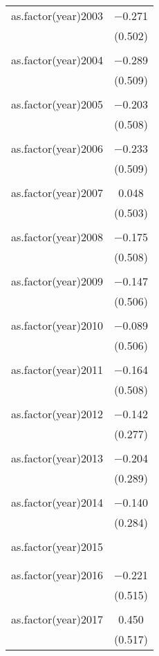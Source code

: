 \documentclass[12pt,letterpaper]{article}
\begin{document}
\begin{table}[!htbp]
\begin{tabular}{@{\extracolsep{5pt}}lc}
		as.factor(year)2003 & $-$0.271 \\ 
		& (0.502) \\ 
		& \\ 
		as.factor(year)2004 & $-$0.289 \\ 
		& (0.509) \\ 
		& \\ 
		as.factor(year)2005 & $-$0.203 \\ 
		& (0.508) \\ 
		& \\ 
		as.factor(year)2006 & $-$0.233 \\ 
		& (0.509) \\ 
		& \\ 
		as.factor(year)2007 & 0.048 \\ 
		& (0.503) \\ 
		& \\ 
		as.factor(year)2008 & $-$0.175 \\ 
		& (0.508) \\ 
		& \\ 
		as.factor(year)2009 & $-$0.147 \\ 
		& (0.506) \\ 
		& \\ 
		as.factor(year)2010 & $-$0.089 \\ 
		& (0.506) \\ 
		& \\ 
		as.factor(year)2011 & $-$0.164 \\ 
		& (0.508) \\ 
		& \\ 
		as.factor(year)2012 & $-$0.142 \\ 
		& (0.277) \\ 
		& \\ 
		as.factor(year)2013 & $-$0.204 \\ 
		& (0.289) \\ 
		& \\ 
		as.factor(year)2014 & $-$0.140 \\ 
		& (0.284) \\ 
		& \\ 
		as.factor(year)2015 &  \\ 
		&  \\ 
		& \\ 
		as.factor(year)2016 & $-$0.221 \\ 
		& (0.515) \\ 
		& \\ 
		as.factor(year)2017 & 0.450 \\ 
		& (0.517) \\ 

\end{tabular}
\end{table}
\end{document}
